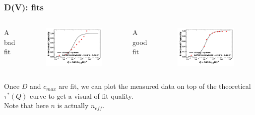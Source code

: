 \documentclass{beamer}
\begin{document}
\begin{frame}
\frametitle{D(V): fits}

\begin{columns}
	
	\centering A bad fit
	\vspace{-0.4cm}
	\begin{figure}
		\includegraphics[width=0.95\linewidth]{figs/Li112Ni44Mn44O2_Atlung-sphere_3300.jpg}
	\end{figure}
	
	\centering A good fit
	\vspace{-0.4cm}
	\begin{figure}
	\includegraphics[width=0.95\linewidth]{figs/Li112Ni44Mn44O2_Atlung-sphere_4250.jpg}
	\end{figure}
	
\end{columns}

Once $D$ and $c_{max}$ are fit, we can plot the measured data on top of the theoretical $\tau^*(Q)$ curve to get a visual of fit quality. \\
Note that here $n$ is actually $n_{eff}$.

\end{frame}
\end{document}
